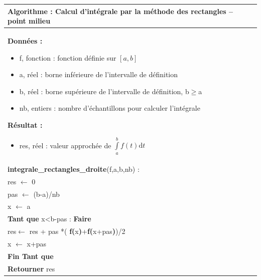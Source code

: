 \documentclass[10pt]{article}
\begin{document}
\begin{pseudo}
\begin{center}
\begin{tabular}{p{}}
\hline
\textbf{Algorithme :} Calcul d'intégrale par la méthode des rectangles -- point milieu\\
\hline
\textbf{Données :}
\begin{itemize}
\item \textsf{f}, fonction : fonction définie sur $[a,b]$  
\item \textsf{a}, réel : borne inférieure de l'intervalle de définition
\item \textsf{b}, réel : borne supérieure de l'intervalle de définition, \textsf{b$\geq$a}
\item \textsf{nb}, entiers : nombre d'échantillons pour calculer l'intégrale
\end{itemize}
\textbf{Résultat :} 
\begin{itemize}
\item \textsf{res}, réel : valeur approchée de $\int\limits_a^b f(t)\text{d}t$
\end{itemize}
\\
\textbf{integrale\_rectangles\_droite}(\textsf{f,a,b,nb}) :\\
\hspace{.4cm}\textsf{res} $\leftarrow$ \textsf{0}\\
\hspace{.4cm}\textsf{pas} $\leftarrow$ \textsf{(b-a)/nb}\\
\hspace{.4cm}\textsf{x} $\leftarrow$ \textsf{a}\\
\hspace{.4cm}\textbf{Tant que} \textsf{x<b-pas} : \textbf{Faire}\\
\hspace{.8cm}\textsf{res}$\leftarrow$ \textsf{res + pas *(} 
\textbf{f(}\textsf{x}\textbf{)}+\textbf{f(}\textsf{x+pas}\textbf{)}\textsf{)/2}\\
\hspace{.8cm}\textsf{x} $\leftarrow$ \textsf{x+pas}\\
\hspace{.4cm}\textbf{Fin Tant que} \\
\hspace{.4cm}\textbf{Retourner} \textsf{res}\\
\hline
\end{tabular}
\end{center}
\end{pseudo}
\end{document}
